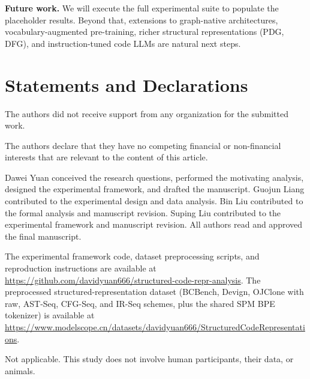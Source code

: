 \documentclass[pdflatex,sn-mathphys,Numbered]{sn-jnl}
\begin{document}
\textbf{Future work.} We will execute the full experimental suite to populate the placeholder results. Beyond that, extensions to graph-native architectures, vocabulary-augmented pre-training, richer structural representations (PDG, DFG), and instruction-tuned code LLMs are natural next steps.

\FloatBarrier

\backmatter
\section*{Statements and Declarations}
The authors did not receive support from any organization for the submitted work.

The authors declare that they have no competing financial or non-financial interests that are relevant to the content of this article.

Dawei Yuan conceived the research questions, performed the motivating analysis, designed the experimental framework, and drafted the manuscript. Guojun Liang contributed to the experimental design and data analysis. Bin Liu contributed to the formal analysis and manuscript revision. Suping Liu contributed to the experimental framework and manuscript revision. All authors read and approved the final manuscript.

The experimental framework code, dataset preprocessing scripts, and reproduction instructions are available at \url{https://github.com/davidyuan666/structured-code-repr-analysis}. The preprocessed structured-representation dataset (BCBench, Devign, OJClone with raw, AST-Seq, CFG-Seq, and IR-Seq schemes, plus the shared SPM BPE tokenizer) is available at \url{https://www.modelscope.cn/datasets/davidyuan666/StructuredCodeRepresentations}.

Not applicable. This study does not involve human participants, their data, or animals.



\end{document}
